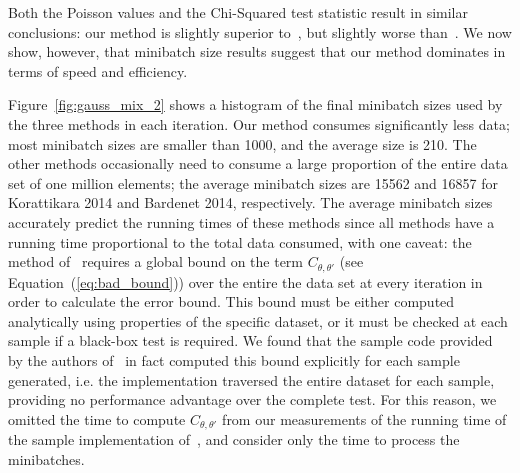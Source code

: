 \documentclass[twoside]{article} \usepackage{aistats2017}
\begin{document}
Both the Poisson values and the Chi-Squared test statistic result in similar
conclusions: our method is slightly superior to~\citet{cutting_mh_2014}, but
slightly worse than~\citet{icml2014c1_bardenet14}. We now show, however, that
minibatch size results suggest that our method dominates in terms of speed and
efficiency.

Figure~\ref{fig:gauss_mix_2} shows a histogram of the final minibatch sizes used
by the three methods in each iteration. Our method consumes significantly less
data; most minibatch sizes are smaller than 1000, and the average size is 210.
The other methods occasionally need to consume a large proportion of the
entire data set of one million elements; the average minibatch sizes are 15562
and 16857 for Korattikara 2014 and Bardenet 2014, respectively. The average
minibatch sizes accurately predict the running times of these methods since
all methods have a running time proportional to the total data consumed, with
one caveat: the method of~\citet{icml2014c1_bardenet14} requires a global bound
on the term $C_{\theta,\theta'}$ (see Equation~(\ref{eq:bad_bound})) over the
entire the data set at every iteration in order to calculate the error bound.
This bound must be either computed analytically using properties of the specific
dataset, or it must be checked at each sample if a black-box test is required.
We found that the sample code provided by the authors
of~\citet{icml2014c1_bardenet14} in fact computed this bound explicitly for each
sample generated, i.e. the implementation traversed the entire dataset for each
sample, providing no performance advantage over the complete test. For this
reason, we omitted the time to compute $C_{\theta,\theta'}$ from our
measurements of the running time of the sample implementation
of~\citet{icml2014c1_bardenet14}, and consider only the time to process the
minibatches.

\end{document}
